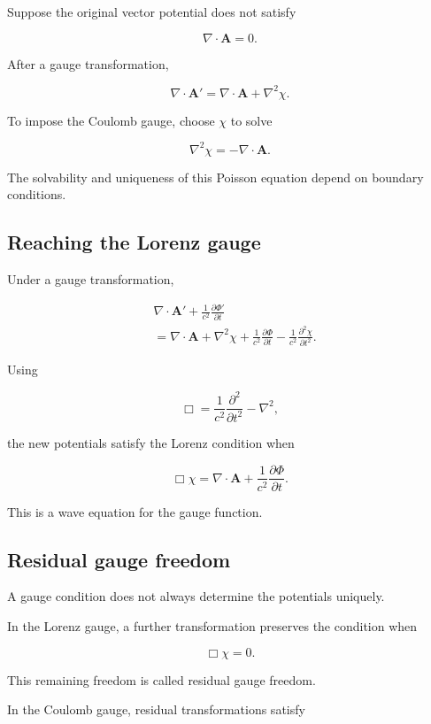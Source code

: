 Suppose the original vector potential does not satisfy

\[
\nabla\cdot\mathbf{A}=0.
\]

After a gauge transformation,

\[
\nabla\cdot\mathbf{A}'
=
\nabla\cdot\mathbf{A}
+
\nabla^2\chi.
\]

To impose the Coulomb gauge, choose \(\chi\) to solve

\[
\boxed{
\nabla^2\chi
=
-
\nabla\cdot\mathbf{A}
}.
\]

The solvability and uniqueness of this Poisson equation depend on boundary conditions.

\subsection{Reaching the Lorenz gauge}

Under a gauge transformation,

\[
\begin{aligned}
&\nabla\cdot\mathbf{A}'
+
\frac{1}{c^2}
\frac{\partial\Phi'}{\partial t}
\\
&=
\nabla\cdot\mathbf{A}
+
\nabla^2\chi
+
\frac{1}{c^2}
\frac{\partial\Phi}{\partial t}
-
\frac{1}{c^2}
\frac{\partial^2\chi}{\partial t^2}.
\end{aligned}
\]

Using

\[
\Box
=
\frac{1}{c^2}
\frac{\partial^2}{\partial t^2}
-
\nabla^2,
\]

the new potentials satisfy the Lorenz condition when

\[
\boxed{
\Box\chi
=
\nabla\cdot\mathbf{A}
+
\frac{1}{c^2}
\frac{\partial\Phi}{\partial t}
}.
\]

This is a wave equation for the gauge function.

\subsection{Residual gauge freedom}

A gauge condition does not always determine the potentials uniquely.

In the Lorenz gauge, a further transformation preserves the condition when

\[
\boxed{
\Box\chi=0
}.
\]

This remaining freedom is called residual gauge freedom.

In the Coulomb gauge, residual transformations satisfy

